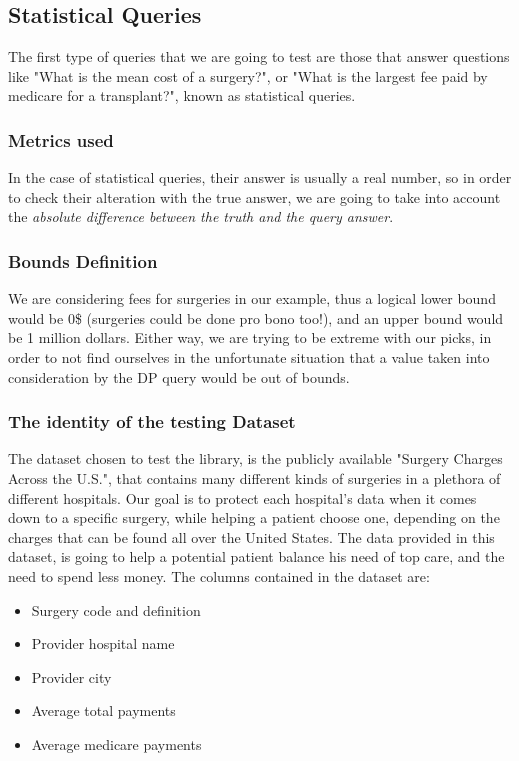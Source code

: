 \subsection{Statistical Queries}

The first type of queries that we are going to test are those that answer questions like "What is the mean cost of a surgery?", or "What is the largest fee paid by medicare for a transplant?", known as statistical queries. 

\subsubsection{Metrics used}

In the case of statistical queries, their answer is usually a real number, so in order to check their alteration with the true answer, we are going to take into account the \emph{absolute difference between the truth and the query answer}. 

\subsubsection{Bounds Definition}

We are considering fees for surgeries in our example, thus a logical lower bound would be 0\$ (surgeries could be done pro bono too!), and an upper bound would be 1 million dollars. Either way, we are trying to be extreme with our picks, in order to not find ourselves in the unfortunate situation that a value taken into consideration by the DP query would be out of bounds.

\subsubsection{The identity of the testing Dataset}

The dataset chosen to test the library, is the publicly available "Surgery Charges Across the U.S.", that contains many different kinds of surgeries in a plethora of different hospitals. Our goal is to protect each hospital's data when it comes down to a specific surgery, while helping a patient choose one, depending on the charges that can be found all over the United States. The data provided in this dataset, is going to help a potential patient balance his need of top care, and the need to spend less money. The columns contained in the dataset are:

\begin{itemize}
    \item Surgery code and definition
    \item Provider hospital name
    \item Provider city
    \item Average total payments
    \item Average medicare payments
\end{itemize}

